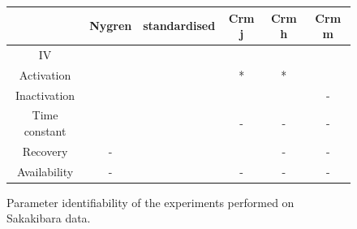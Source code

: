 \documentclass[11pt]{report}
\newcommand{\cmark}{ \color{green} \ding{51}}%
\newcommand{\xmark}{ \color{red} \ding{55}}%
\begin{document}
\begin{figure}[H]
\centering
\captionsetup{singlelinecheck = false, format= hang, justification=centerlast, labelsep=space}
\begin{measuredfigure}
\begin{tabular}{|c|c|c|c|c|c|}
\hline
& Nygren & standardised & Crm j & Crm h & Crm m\\
\hline
IV & \cmark   &  \cmark & \cmark & \cmark & \cmark  \\
\hline
Activation &  \cmark  &   \cmark & \cmark * & \cmark * &   \cmark \\
\hline
Inactivation &  \cmark &  \xmark &  \cmark & \cmark &   - \\
\hline
Time constant &  \cmark &  \cmark & - & - & -   \\
\hline
Recovery & - &  \xmark & \cmark  & - &  -  \\
\hline
Availability & - &  \cmark & - & - & -  \\
\hline
\end{tabular}
\caption{Parameter identifiability of the experiments performed on Sakakibara data.  \cite{Sakakibara1992}}
\end{measuredfigure}
\addtocounter{figure}{-1}
\label{tab:ParameterIdentifiabilitySaka}
\end{figure}
\end{document}
